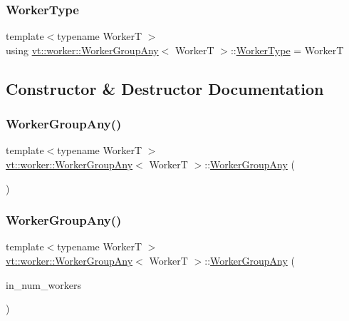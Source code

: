 \subsubsection{\texorpdfstring{Worker\+Type}{WorkerType}}
{\footnotesize\ttfamily template$<$typename WorkerT $>$ \\
using \hyperlink{structvt_1_1worker_1_1_worker_group_any}{vt\+::worker\+::\+Worker\+Group\+Any}$<$ WorkerT $>$\+::\hyperlink{structvt_1_1worker_1_1_worker_group_any_af82b0c60f233e4ec668532ae46cda2e6}{Worker\+Type} =  WorkerT}



\subsection{Constructor \& Destructor Documentation}
\mbox{\label{structvt_1_1worker_1_1_worker_group_any_abe95416ad8e1c0bde799888318491aca}} 
\subsubsection{\texorpdfstring{Worker\+Group\+Any()}{WorkerGroupAny()}\hspace{0.1cm}{\footnotesize\ttfamily [1/2]}}
{\footnotesize\ttfamily template$<$typename WorkerT $>$ \\
\hyperlink{structvt_1_1worker_1_1_worker_group_any}{vt\+::worker\+::\+Worker\+Group\+Any}$<$ WorkerT $>$\+::\hyperlink{structvt_1_1worker_1_1_worker_group_any}{Worker\+Group\+Any} (\begin{DoxyParamCaption}{ }\end{DoxyParamCaption})}

\mbox{\label{structvt_1_1worker_1_1_worker_group_any_ab3857978c11fd6578d786d0c42a2e784}} 
\subsubsection{\texorpdfstring{Worker\+Group\+Any()}{WorkerGroupAny()}\hspace{0.1cm}{\footnotesize\ttfamily [2/2]}}
{\footnotesize\ttfamily template$<$typename WorkerT $>$ \\
\hyperlink{structvt_1_1worker_1_1_worker_group_any}{vt\+::worker\+::\+Worker\+Group\+Any}$<$ WorkerT $>$\+::\hyperlink{structvt_1_1worker_1_1_worker_group_any}{Worker\+Group\+Any} (\begin{DoxyParamCaption}\item[{\hyperlink{namespacevt_aa93398ea48f2cb6c188512250f7cc248}{Worker\+Count\+Type} const \&}]{in\+\_\+num\+\_\+workers }\end{DoxyParamCaption})}


